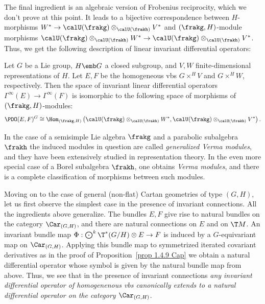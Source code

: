 The final ingredient is an algebraic version of Frobenius reciprocity, which we don't prove at this point. It leads to a bijective correspondence between $H$-morphisms $W^\ast\to \calU(\frakg)\otimes_{\calU(\frakh)}V^\ast$ and $(\frakg,H)$-module morphisms $\calU(\frakg)\otimes_{\calU(\frakh)}W^\ast\to \calU(\frakg)\otimes_{\calU(\frakh)}V^\ast$. Thus, we get the following description of linear invariant differential operators:

\begin{thm}\label{thm 1.4.10 Cap}
    Let $G$ be a Lie group, $H\emb G$ a closed subgroup, and $V,W$ finite-dimensional representations of $H$. Let $E,F$ be the homogeneous \glspl{vb} $G\times^H V$  and $G\times^H W$, respectively. Then the space of invariant linear differential operators $\Gamma^\infty(E)\to \Gamma^\infty(F)$ is isomorphic to the following space of morphisms of $(\frakg,H)$-modules:
    \[\PDO(E,F)^G\cong \Hom_{(\frakg,H)}\left(\calU(\frakg)\otimes_{\calU(\frakh)}W^\ast,\calU(\frakg)\otimes_{\calU(\frakh)}V^\ast\right).\] 
\end{thm}

In the case of a semisimple Lie algebra $\frakg$ and a parabolic subalgebra $\frakh$ the induced modules in question are called \emph{generalized Verma modules}, and they have been extensively studied in representation theory. In the even more special case of a Borel subalgebra $\frakh$, one obtains \emph{Verma modules}, and there is a complete classification of morphisms between such modules.


Moving on to the case of general (non-flat) Cartan geometries of type $(G,H)$, let us first observe the simplest case in the presence of invariant connections. All the ingredients above generalize. The bundles $E,F$ give rise to natural bundles on the category $\Car_{(G,H)}$, and there are natural connections on $E$ and on $\T M$. An invariant bundle map $\Phi:\bigodot^k \T^\ast(G\slash H)\otimes E\to F$ is induced by a $G$-equivariant map on $\Car_{(G,H)}$. Applying this bundle map to symmetrized iterated covariant derivatives as in the proof of Proposition~\ref{prop 1.4.9 Cap} we obtain a natural differential operator whose symbol is given by the natural bundle map from above. Thus, we see that in the presence of invariant connections \emph{any invariant differential operator of homogenenous \glspl{vb} canonically extends to a natural differential operator on the category $\Car_{(G,H)}$}.

